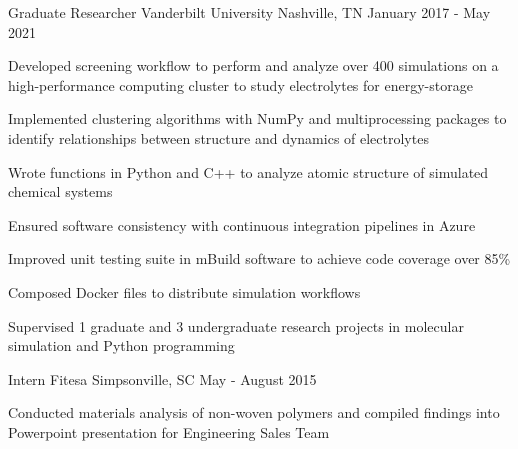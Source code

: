
\begin{cventries}
  \cventry
    {Graduate Researcher} %
    {Vanderbilt University} %
    {Nashville, TN} %
    {January 2017 - May 2021} %
    {
        \begin{cvitemstitle}
        \end{cvitemstitle}
      \begin{cvsubitems} %
        \item{Developed screening workflow to perform and analyze over 400
            simulations on a high-performance \newline computing cluster to study
              electrolytes for energy-storage}
        \item{Implemented clustering algorithms with NumPy and multiprocessing
            packages to identify relationships \newline between structure and dynamics of
              electrolytes}
        \item{Wrote functions in Python and C++ to analyze atomic structure of
            simulated chemical systems}
      \end{cvsubitems}
      \begin{cvitemstitle}
      \end{cvitemstitle}
      \begin{cvsubitems}
        \item{Ensured software consistency with continuous integration
            pipelines in Azure}
        \item{Improved unit testing suite in mBuild software to achieve code coverage over
            85\%}
        \item{Composed Docker files to distribute simulation workflows}
        \item {Supervised 1 graduate and 3 undergraduate research 
            projects in molecular simulation and Python programming}
      \end{cvsubitems}
    }


  \cventry
    {Intern} %
    {Fitesa} %
    {Simpsonville, SC} %
    {May - August 2015} %
    {
      \begin{cvitems} %
        \item{Conducted materials analysis of non-woven polymers and compiled
            findings into Powerpoint \newline presentation for Engineering Sales Team}
      \end{cvitems}
    }
\end{cventries}
